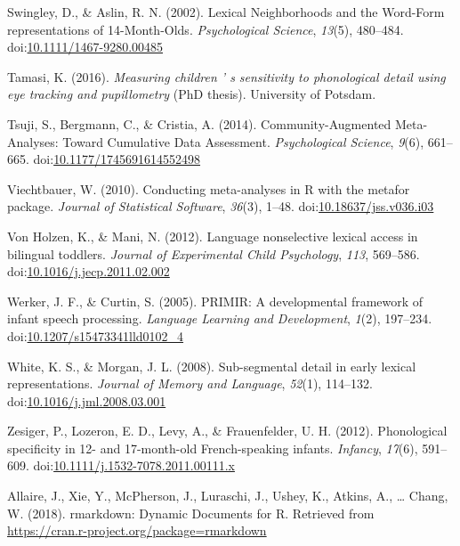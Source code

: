 \documentclass[
  man, noextraspace]{apa6}
\begin{document}
\leavevmode\hypertarget{ref-Swingley2002}{}%
Swingley, D., \& Aslin, R. N. (2002). Lexical Neighborhoods and the Word-Form representations of 14-Month-Olds. \emph{Psychological Science}, \emph{13}(5), 480--484. doi:\href{https://doi.org/10.1111/1467-9280.00485}{10.1111/1467-9280.00485}

\leavevmode\hypertarget{ref-Tamasi2016}{}%
Tamasi, K. (2016). \emph{Measuring children ' s sensitivity to phonological detail using eye tracking and pupillometry} (PhD thesis). University of Potsdam.

\leavevmode\hypertarget{ref-Tsuji2014}{}%
Tsuji, S., Bergmann, C., \& Cristia, A. (2014). Community-Augmented Meta-Analyses: Toward Cumulative Data Assessment. \emph{Psychological Science}, \emph{9}(6), 661--665. doi:\href{https://doi.org/10.1177/1745691614552498}{10.1177/1745691614552498}

\leavevmode\hypertarget{ref-metafor}{}%
Viechtbauer, W. (2010). Conducting meta-analyses in R with the metafor package. \emph{Journal of Statistical Software}, \emph{36}(3), 1--48. doi:\href{https://doi.org/10.18637/jss.v036.i03}{10.18637/jss.v036.i03}

\leavevmode\hypertarget{ref-VonHolzen2012}{}%
Von Holzen, K., \& Mani, N. (2012). Language nonselective lexical access in bilingual toddlers. \emph{Journal of Experimental Child Psychology}, \emph{113}, 569--586. doi:\href{https://doi.org/10.1016/j.jecp.2011.02.002}{10.1016/j.jecp.2011.02.002}

\leavevmode\hypertarget{ref-Werker2005}{}%
Werker, J. F., \& Curtin, S. (2005). PRIMIR: A developmental framework of infant speech processing. \emph{Language Learning and Development}, \emph{1}(2), 197--234. doi:\href{https://doi.org/10.1207/s15473341lld0102_4}{10.1207/s15473341lld0102\_4}

\leavevmode\hypertarget{ref-White2008}{}%
White, K. S., \& Morgan, J. L. (2008). Sub-segmental detail in early lexical representations. \emph{Journal of Memory and Language}, \emph{52}(1), 114--132. doi:\href{https://doi.org/10.1016/j.jml.2008.03.001}{10.1016/j.jml.2008.03.001}

\leavevmode\hypertarget{ref-Zesiger2012}{}%
Zesiger, P., Lozeron, E. D., Levy, A., \& Frauenfelder, U. H. (2012). Phonological specificity in 12- and 17-month-old French-speaking infants. \emph{Infancy}, \emph{17}(6), 591--609. doi:\href{https://doi.org/10.1111/j.1532-7078.2011.00111.x}{10.1111/j.1532-7078.2011.00111.x}

\leavevmode\hypertarget{ref-RMarkdown}{}%
Allaire, J., Xie, Y., McPherson, J., Luraschi, J., Ushey, K., Atkins, A., \ldots{} Chang, W. (2018). rmarkdown: Dynamic Documents for R. Retrieved from \url{https://cran.r-project.org/package=rmarkdown}
\end{document}
